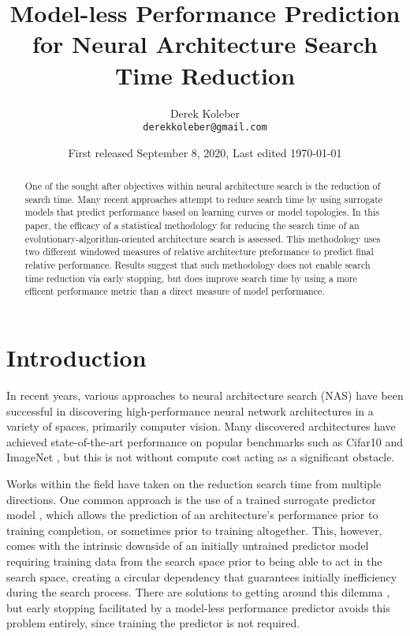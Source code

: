 \documentclass[twocolumn]{article}
\title{Model-less Performance Prediction for Neural Architecture Search Time Reduction}
\date{First released September 8, 2020, Last edited \today}
\author{%
  Derek Koleber \\
  \texttt{derekkoleber@gmail.com}  
}
\begin{document}
\maketitle

\begin{abstract}
    One of the sought after objectives within neural architecture search
    is the reduction of search time. Many recent approaches attempt to reduce
    search time by using surrogate models that predict performance
    based on learning curves or model topologies. 
    In this paper, the efficacy of a statistical methodology for reducing
    the search time of an evolutionary-algorithm-oriented architecture search is assessed. 
    This methodology uses two different windowed measures of relative architecture preformance
    to predict final relative performance.
    Results suggest that such methodology does not enable search time reduction via early stopping, 
    but does improve search time by using a more efficent performance metric than a direct measure of model performance.
\end{abstract}

\section{Introduction}

In recent years, various approaches to neural architecture search (NAS) have been 
successful in discovering high-performance neural network architectures in a variety of spaces, primarily computer vision.
Many discovered architectures have achieved state-of-the-art performance on popular benchmarks such as Cifar10 and ImageNet \cite{nasnet}\cite{amoebanet}\cite{enas}\cite{darts}\cite{econas},
but this is not without compute cost acting as a significant obstacle.

Works within the field have taken on the reduction search time from multiple directions.
One common approach is the use of a trained surrogate predictor model \cite{bayesian_pred}\cite{vsvr_pred}\cite{peephole}\cite{pnas},
which allows the prediction of an architecture's performance prior to training completion, or sometimes prior to training altogether.
This, however, comes with the intrinsic downside of an initially untrained predictor model requiring training data from the search space prior to being able to 
act in the search space, creating a circular dependency that guarantees initially inefficiency during the search process.
There are solutions to getting around this dilemma \cite{pnas}, but early stopping facilitated by a model-less performance predictor
avoids this problem entirely, since training the predictor is not required.
\end{document}
